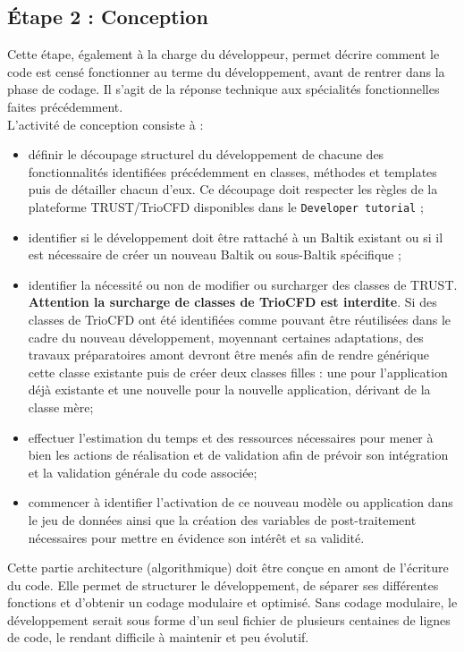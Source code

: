 \subsection{Étape 2 : Conception}
Cette étape, également à la charge du développeur, permet décrire comment le code est censé fonctionner au terme du développement, avant de rentrer dans la phase de codage. Il s'agit de la réponse technique aux spécialités fonctionnelles faites précédemment.\\
L'activité de conception consiste à :\\
\begin{itemize}[label=$\Rightarrow$, font=\LARGE]
   \item définir le découpage structurel du développement de chacune des fonctionnalités identifiées précédemment en classes, méthodes et templates puis de détailler chacun d'eux. Ce découpage doit respecter les règles de la plateforme TRUST/TrioCFD disponibles dans le \texttt{Developer tutorial} ;
   \item identifier si le développement doit être rattaché à un Baltik existant ou si il est nécessaire de créer un nouveau Baltik ou sous-Baltik spécifique ;
   \item identifier la nécessité ou non de modifier ou surcharger des classes de TRUST. \textbf{Attention la surcharge de classes de TrioCFD est interdite}. Si des classes de TrioCFD ont été identifiées comme pouvant être réutilisées dans le cadre du nouveau développement, moyennant certaines adaptations, des travaux préparatoires amont devront être menés afin de rendre générique cette classe existante puis de créer deux classes filles : une pour l'application déjà existante et une nouvelle pour la nouvelle application, dérivant de la classe mère;
   \item effectuer l'estimation du temps et des ressources nécessaires pour mener à bien les actions de réalisation et de validation afin de prévoir son intégration et la validation générale du code associée;
   \item commencer à identifier l'activation de ce nouveau modèle ou application dans le jeu de données ainsi que la création des variables de post-traitement nécessaires pour mettre en évidence son intérêt et sa validité.
 \end{itemize}
Cette partie architecture (algorithmique) doit être con\c cue en amont de l'écriture du code. Elle permet de structurer le développement, de séparer ses différentes fonctions et d'obtenir un codage modulaire et optimisé. Sans codage modulaire, le développement serait sous forme d'un seul fichier de plusieurs centaines de lignes de code, le rendant difficile à maintenir et peu évolutif. 
